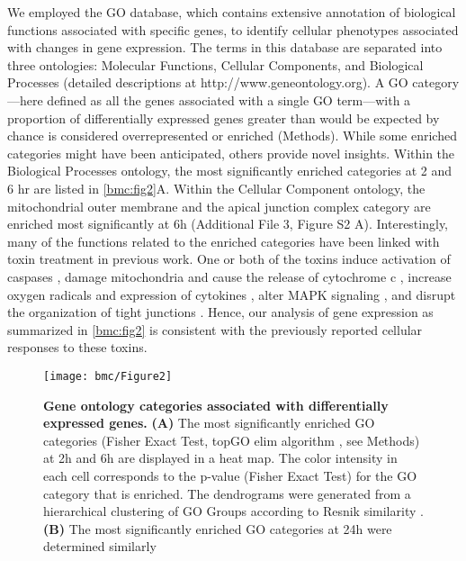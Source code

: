 We employed the GO database, which contains extensive annotation of biological functions associated with specific genes, to identify cellular phenotypes associated with changes in gene expression. The terms in this database are separated into three ontologies: Molecular Functions, Cellular Components, and Biological Processes (detailed descriptions at http://www.geneontology.org). A GO category—here defined as all the genes associated with a single GO term—with a proportion of differentially expressed genes greater than would be expected by chance is considered overrepresented or enriched (Methods). While some enriched categories might have been anticipated, others provide novel insights. Within the Biological Processes ontology, the most significantly enriched categories at 2 and 6 hr are listed in \autoref{bmc:fig2}A. Within the Cellular Component ontology, the mitochondrial outer membrane and the apical junction complex category are enriched most significantly at 6h (Additional File 3, Figure S2 A). Interestingly, many of the functions related to the enriched categories have been linked with toxin treatment in previous work. One or both of the toxins induce activation of caspases \cite{Gerhard:2008wz, QaaposDan:2002uj, Carneiro:2006cw, Brito:2002ky}, damage mitochondria and cause the release of cytochrome c \cite{Matarrese:2007ix, He:2000uc}, increase oxygen radicals and expression of cytokines \cite{He:2002cl,Qiu:1999us,Flegel:1991ws}, alter MAPK signaling \cite{Meyer:2007kj,Lee:2007gj,Na:2005bx}, and disrupt the organization of tight junctions \cite{Nusrat:2001cs}. Hence, our analysis of gene expression as summarized in \autoref{bmc:fig2} is consistent with the previously reported cellular responses to these toxins.

\begin{figure}[h!]
  \centering
  \texttt{[image: bmc/Figure2]}
  \caption[Gene ontology categories associated with differentially expressed genes]{
  \textbf{Gene ontology categories associated with differentially expressed genes.}
  \textbf{(A)} The most significantly enriched GO categories (Fisher Exact Test, topGO elim algorithm \cite{Alexa:2006hg}, see Methods) at 2h and 6h are displayed in a heat map. The color intensity in each cell corresponds to the p-value (Fisher Exact Test) for the GO category that is enriched. The dendrograms were generated from a hierarchical clustering of GO Groups according to Resnik similarity \cite{Resnik:1999jl}.
\textbf{(B)} The most significantly enriched GO categories at 24h were determined similarly
}
  \label{bmc:fig2}
\end{figure}


